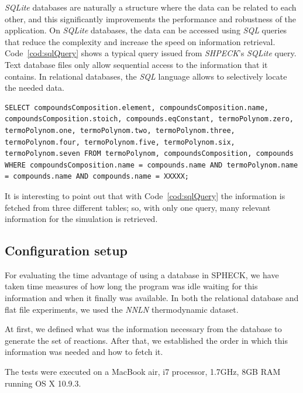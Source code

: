 \emph{SQLite} databases are naturally a structure where the data can be related to each other, and this significantly improvements the performance and robustness of the application. On \emph{SQLite} databases, the data can be accessed using \emph{SQL} queries that reduce the complexity and increase the speed on information retrieval. Code~\ref{cod:sqlQuery} shows a typical query issued from \emph{SHPECK}'s \emph{SQLite} query. Text database files only allow sequential access to the information that it contains. In relational databases, the \emph{SQL} language allows to selectively locate the needed data.


\begin{minipage}{0.8\linewidth}
\begin{lstlisting}[frame=single, label=cod:sqlQuery, caption=\emph{SHPECK}'s \emph{SQLite} example query. The value ”XXXX” is updated to the simulation’s solute name.]
SELECT compoundsComposition.element, compoundsComposition.name, compoundsComposition.stoich, compounds.eqConstant, termoPolynom.zero, termoPolynom.one, termoPolynom.two, termoPolynom.three, termoPolynom.four, termoPolynom.five, termoPolynom.six, termoPolynom.seven FROM termoPolynom, compoundsComposition, compounds WHERE compoundsComposition.name = compounds.name AND termoPolynom.name = compounds.name AND compounds.name = XXXXX;
\end{lstlisting}
\end{minipage}

It is interesting to point out that with Code~\ref{cod:sqlQuery} the information is fetched from three different tables; so, with only one query, many relevant information for the simulation is retrieved.

\subsection{Configuration setup}
For evaluating the time advantage of using a database in SPHECK, we have taken time measures of how long the program was idle waiting for this information and when it finally was available. In both the relational database and flat file experiments, we used the \emph{NNLN} thermodynamic dataset. 


At first, we defined what was the information necessary from the database to generate the set of reactions. After that, we established the order in which this information was needed and how to fetch it.  


The tests were executed on a MacBook air, i7 processor, 1.7GHz, 8GB RAM running OS X 10.9.3.

